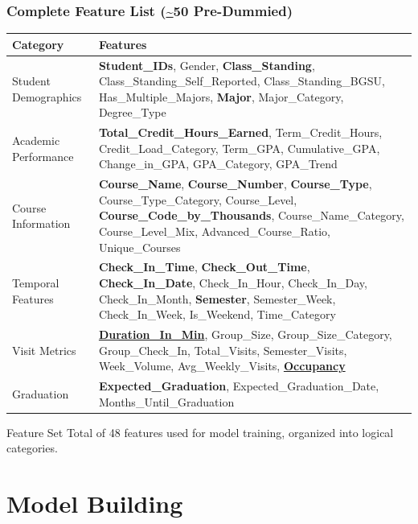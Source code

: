 \documentclass{beamer}
\begin{document}
\begin{frame}
\frametitle{Complete Feature List (\url{~}50 Pre-Dummied)}
    \noindent
    \hspace{-1cm}
    \footnotesize
    \begin{tabular}{>{\columncolor{bgsubrown!20}}m{} >{\arraybackslash}m{}}
    \toprule
    \textbf{Category} & \textbf{Features} \\
    \midrule
    Student Demographics & \textbf{Student\_IDs}, Gender, \textbf{Class\_Standing}, Class\_Standing\_Self\_Reported, Class\_Standing\_BGSU, Has\_Multiple\_Majors, \textbf{Major}, Major\_Category, Degree\_Type \\
    \midrule
    Academic Performance & \textbf{Total\_Credit\_Hours\_Earned}, Term\_Credit\_Hours, Credit\_Load\_Category, Term\_GPA, Cumulative\_GPA, Change\_in\_GPA, GPA\_Category, GPA\_Trend \\
    \midrule
    Course Information & \textbf{Course\_Name}, \textbf{Course\_Number}, \textbf{Course\_Type}, Course\_Type\_Category, Course\_Level, \textbf{Course\_Code\_by\_Thousands}, Course\_Name\_Category, Course\_Level\_Mix, Advanced\_Course\_Ratio, Unique\_Courses \\
    \midrule
    Temporal Features & \textbf{Check\_In\_Time}, \textbf{Check\_Out\_Time}, \textbf{Check\_In\_Date}, Check\_In\_Hour, Check\_In\_Day, Check\_In\_Month, \textbf{Semester}, Semester\_Week, Check\_In\_Week, Is\_Weekend, Time\_Category \\
    \midrule
    Visit Metrics & \underline{\textbf{Duration\_In\_Min}}, Group\_Size, Group\_Size\_Category, Group\_Check\_In, Total\_Visits, Semester\_Visits, Week\_Volume, Avg\_Weekly\_Visits, \underline{\textbf{Occupancy}} \\
    \midrule
    Graduation & \textbf{Expected\_Graduation}, Expected\_Graduation\_Date, Months\_Until\_Graduation \\
    \bottomrule
    \end{tabular}

    \begin{alertblock}{Feature Set}
        Total of 48 features used for model training, organized into logical categories.
    \end{alertblock}
\end{frame}




\section{Model Building}
\end{document}
